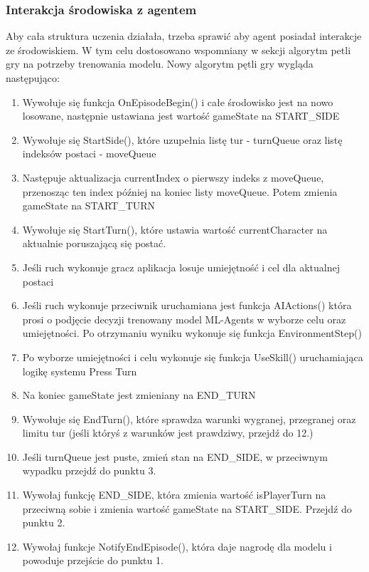 \documentclass{SGGW-thesis}
\begin{document}
\subsubsection{Interakcja środowiska z agentem}
Aby cała struktura uczenia działała, trzeba sprawić aby agent posiadał interakcje ze środowiskiem. W tym celu dostosowano wspomniany w sekcji  algorytm petli gry na potrzeby trenowania modelu.
Nowy algorytm pętli gry wygląda następująco:
\begin{enumerate}
  \item{Wywołuje się funkcja OnEpisodeBegin() i całe środowisko jest na nowo losowane, następnie ustawiana jest wartość gameState na START\_SIDE}
  \item{Wywołuje się StartSide(), które uzupełnia listę tur - turnQueue oraz listę indeksów postaci - moveQueue}
  \item{Następuje aktualizacja currentIndex o pierwszy indeks z moveQueue, przenosząc ten index później na koniec listy moveQueue. Potem zmienia gameState na START\_TURN}
  \item{Wywołuje się StartTurn(), które ustawia wartość currentCharacter na aktualnie poruszającą się postać.}
  \item{Jeśli ruch wykonuje gracz aplikacja losuje umiejętność i cel dla aktualnej postaci}
  \item{Jeśli ruch wykonuje przeciwnik uruchamiana jest funkcja AIActions() która prosi o podjęcie decyzji trenowany model ML-Agents w wyborze celu oraz umiejętności. Po otrzymaniu wyniku wykonuje się funkcja EnvironmentStep()}
  \item{Po wyborze umiejętności i celu wykonuje się funkcja UseSkill() uruchamiająca logikę systemu Press Turn}
  \item{Na koniec gameState jest zmieniany na END\_TURN}
  \item{Wywołuje się EndTurn(), które sprawdza warunki wygranej, przegranej oraz limitu tur (jeśli któryś z warunków jest prawdziwy, przejdź do 12.)}
  \item{Jeśli turnQueue jest puste, zmień stan na END\_SIDE, w przeciwnym wypadku przejdź do punktu 3.}
  \item{Wywołaj funkcję END\_SIDE, która zmienia wartość isPlayerTurn na przeciwną sobie i zmienia wartość gameState na START\_SIDE. Przejdź do punktu 2.}
  \item{Wywołaj funkcje NotifyEndEpisode(), która daje nagrodę dla modelu i powoduje przejście do punktu 1.}
\end{enumerate}
\end{document}
